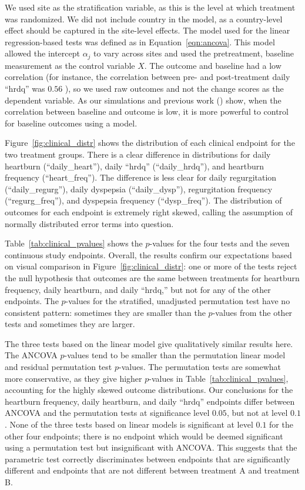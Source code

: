 \documentclass[12pt]{article}
\newcommand{\todo}[1]{{\color{red}{TO DO: \sc #1}}}
\begin{document}
We used site as the stratification variable, as this is the level at which treatment was randomized.
We did not include country in the model, as a country-level effect should be captured in the site-level effects.
The model used for the linear regression-based tests was defined as in Equation~\ref{eqn:ancova}.
This model allowed the intercept $\alpha_j$ to vary across sites and used the pretreatment, baseline measurement as the control variable $X$.
The outcome and baseline had a low correlation (for instance, the correlation between pre- and post-treatment daily ``hrdq'' was $0.56$ \todo{were other outcomes even lower? the cutoff for correlation was 0.5}), so we used raw outcomes and not the change scores as the dependent variable. 
As our simulations and previous work (\cite{frison_repeated_1992}) show, when the correlation between baseline and outcome is low, it is more powerful to control for baseline outcomes using a model.

Figure~\ref{fig:clinical_distr} shows the distribution of each clinical endpoint for the two treatment groups.
There is a clear difference in distributions for daily heartburn (``daily\_heart''), daily ``hrdq'' (``daily\_hrdq''), and heartburn frequency (``heart\_freq'').
The difference is less clear for daily regurgitation (``daily\_regurg''), daily dyspepsia (``daily\_dysp''), regurgitation frequency (``regurg\_freq''), and dyspepsia frequency (``dysp\_freq'').
The distribution of outcomes for each endpoint is extremely right skewed, calling the assumption of normally distributed error terms into question.

Table~\ref{tab:clinical_pvalues} shows the $p$-values for the four tests and the seven continuous study endpoints.
Overall, the results confirm our expectations based on visual comparison in Figure~\ref{fig:clinical_distr}:
one or more of the tests reject the null hypothesis that outcomes are the same between treatments for heartburn frequency, daily heartburn, and daily ``hrdq,''
but not for any of the other endpoints.
The $p$-values for the stratified, unadjusted permutation test have no consistent pattern: sometimes they are smaller than the $p$-values from the other tests and sometimes they are larger.

The three tests based on the linear model give qualitatively similar results here.
The ANCOVA $p$-values tend to be smaller than the permutation linear model and residual permutation test $p$-values.
The permutation tests are somewhat more conservative, as they give higher $p$-values in Table~\ref{tab:clinical_pvalues}, accounting for the highly skewed outcome distributions. \todo{is this a correct statement? conservative means reject less often}
Our conclusions for the heartburn frequency, daily heartburn, and daily ``hrdq'' endpoints differ between ANCOVA and the permutation tests at significance level $0.05$, but not at level $0.1$.
None of the three tests based on linear models is significant at level $0.1$ for the other four endpoints;
there is no endpoint which would be deemed significant using a permutation test but insignificant with ANCOVA.
This suggests that the parametric test correctly discriminates between endpoints that are significantly different and endpoints that are not different between treatment A and treatment B.
\end{document}
